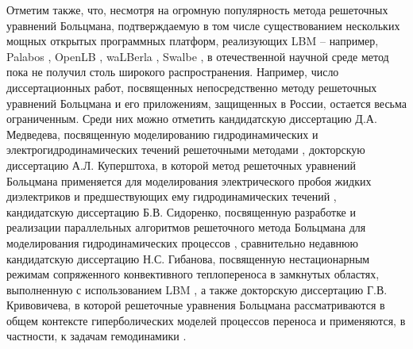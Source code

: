 \documentclass[12pt,a4paper]{article}
\begin{document}

Отметим также, что, несмотря на огромную популярность метода решеточных уравнений Больцмана, подтверждаемую в том числе существованием нескольких мощных открытых программных платформ, реализующих LBM -- например, Palabos \cite{Latt2021}, OpenLB \cite{Krause2021}, waLBerla \cite{Bauer2021}, Swalbe \cite{Zitz2019, Zitz2022}, в отечественной научной среде метод пока не получил столь широкого распространения. Например, число диссертационных работ, посвященных непосредственно методу решеточных уравнений Больцмана и его приложениям, защищенных в России, остается весьма ограниченным. Среди них можно отметить кандидатскую диссертацию Д.А. Медведева, посвященную моделированию гидродинамических и электрогидродинамических течений решеточными методами \cite{Medvedev2002}, докторскую диссертацию А.Л. Куперштоха, в которой метод решеточных уравнений Больцмана применяется для моделирования электрического пробоя жидких диэлектриков и предшествующих ему гидродинамических течений \cite{Kuperstokh2006}, кандидатскую диссертацию Б.В. Сидоренко, посвященную разработке и реализации параллельных алгоритмов решеточного метода Больцмана для моделирования гидродинамических процессов \cite{Sidorenko2012}, сравнительно недавнюю кандидатскую диссертацию Н.С. Гибанова, посвященную нестационарным режимам сопряженного конвективного теплопереноса в замкнутых областях, выполненную с использованием LBM \cite{Gibanov2021}, а также докторскую диссертацию Г.В. Кривовичева, в которой решеточные уравнения Больцмана рассматриваются в общем контексте гиперболических моделей процессов переноса и применяются, в частности, к задачам гемодинамики \cite{Krivovichev2022}.

\end{document}
